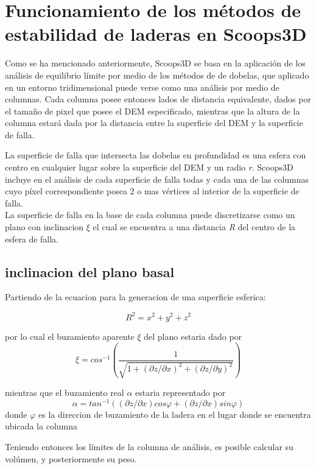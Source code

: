 \section{Funcionamiento de los m\'etodos de estabilidad de laderas en Scoops3D}



Como se ha mencionado anteriormente, Scoops3D se basa en la aplicaci\'on de los an\'alisis de equilibrio l\'imite por medio de los m\'etodos de de dobelas, que aplicado en un entorno tridimensional puede verse como una an\'alisis por medio de columnas.
Cada columna posee entonces lados de distancia equivalente, dados por el tama\~no de pixel que posee el DEM especificado, mientras que la altura de la columna estar\'a dada por la distancia entre la superficie del DEM y la superficie de falla.

La superficie de falla que intersecta las dobelas en profundidad es una esfera con centro en cualquier lugar sobre la superficie del DEM y un radio \textit{r}. Scoops3D incluye en el an\'alisis de cada superficie de falla todas y cada una de las columnas cuyo p\'ixel correspondiente posea 2 o mas v\'ertices al interior de la superficie de falla.\\

La superficie de falla en la base de cada columna puede discretizarse como un plano con inclinacion $ \xi$ el cual se encuentra a una distancia \textit{R} del centro de la esfera de falla.


\subsection{inclinacion del plano basal}


Partiendo de la ecuacion para la generacion de una superficie esferica:

$$ \textit{R}^{2} = \textit{x}^{2} + \textit{y}^{2} + \textit{z}^{2}$$

por lo cual el buzamiento aparente $\xi$ del plano estaria dado por
$$ \xi = \textit{cos}^{-1}  (\dfrac{1}{\sqrt{1+(\partial z/ \partial x)^{2} + (\partial z/ \partial y)^{2} }})   $$ 

mientras que el buzamiento real $ \alpha$ estaria representado por \\
$$ \alpha = tan^{-1} ((\partial z/ \partial x)\textit{cos}\varphi +(\partial z/ \partial x)\textit{sin}\varphi )  $$
donde $\varphi$ es la direccion de buzamiento de la ladera en el lugar donde se encuentra ubicada la columna

Teniendo entonces los l\'imites de la columna de an\'alisis, es posible calcular su vol\'umen, y posteriormente su peso.

